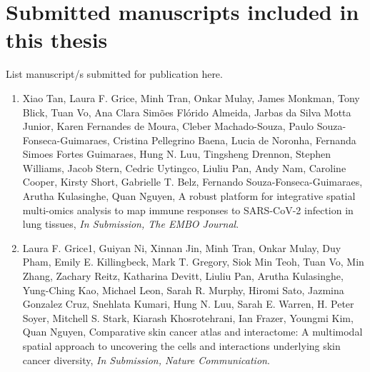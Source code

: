 



\section*{Submitted manuscripts included in this thesis}

\begin{instructional}
	List manuscript/s submitted for publication here. 
    
    \begin{enumerate}

    \item Xiao Tan, Laura F. Grice, Minh Tran, Onkar Mulay, James Monkman, Tony Blick, Tuan Vo, Ana Clara Simões Flórido Almeida, Jarbas da Silva Motta Junior, Karen Fernandes de Moura, Cleber Machado-Souza, Paulo Souza-Fonseca-Guimaraes, Cristina Pellegrino Baena, Lucia de Noronha, Fernanda Simoes Fortes Guimaraes, Hung N. Luu, Tingsheng Drennon, Stephen Williams, Jacob Stern, Cedric Uytingco, Liuliu Pan, Andy Nam, Caroline Cooper, Kirsty Short, Gabrielle T. Belz, Fernando Souza-Fonseca-Guimaraes, Arutha Kulasinghe, Quan Nguyen, A robust platform for integrative spatial multi-omics analysis to map immune responses to SARS-CoV-2 infection in lung tissues, \textit{In Submission, The EMBO Journal}.
    
    \item Laura F. Grice1, Guiyan Ni, Xinnan Jin, Minh Tran, Onkar Mulay, Duy Pham, Emily E. Killingbeck, Mark T. Gregory, Siok Min Teoh, Tuan Vo, Min Zhang, Zachary Reitz, Katharina Devitt, Liuliu Pan, Arutha Kulasinghe, Yung-Ching Kao, Michael Leon, Sarah R. Murphy, Hiromi Sato, Jazmina Gonzalez Cruz, Snehlata Kumari, Hung N. Luu, Sarah E. Warren, H. Peter Soyer, Mitchell S. Stark, Kiarash Khosrotehrani, Ian Frazer, Youngmi Kim, Quan Nguyen, Comparative skin cancer atlas and interactome: A multi\-modal spatial approach to uncovering the cells and interactions underlying skin cancer diversity, \textit{In Submission, Nature Communication}.


\end{enumerate}
\end{instructional}
